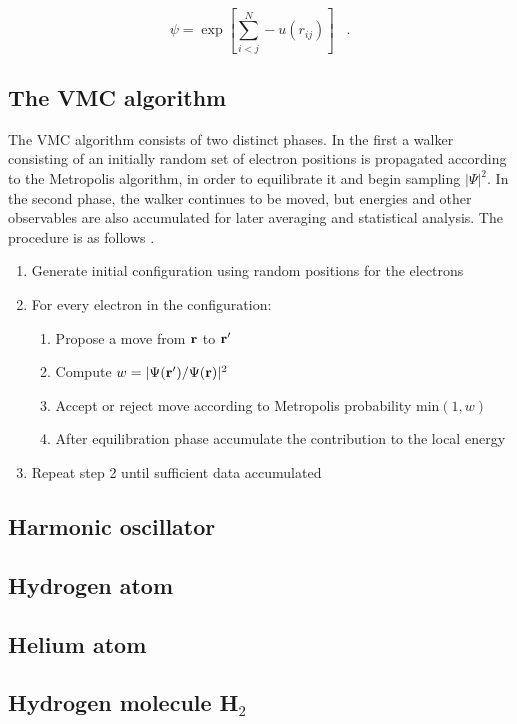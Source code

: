 \documentclass{article}
\begin{document}
\begin{equation}
\psi=\exp \left[ \sum_{i<j}^{N} -u(r_{ij}) \right] \;\;\;.
\end{equation}

\subsection{The VMC algorithm}
The VMC algorithm consists of two distinct phases. In the first a walker consisting of an initially random set of electron positions is propagated according to the Metropolis algorithm, in order to equilibrate it and begin sampling $\vert\Psi\vert^2$. In the second phase, the walker continues to be moved, but energies and other observables are also accumulated for later averaging and statistical analysis. The procedure is as follows \citep{thijssen2007computational}.

  \begin{enumerate}
    \item Generate initial configuration using random positions for the electrons
    \item For every electron in the configuration:
    \begin{enumerate}
     \item Propose a move from ${\bf r}$ to  ${\bf r}^\prime$
     \item Compute  $w=\vert\Psi({\bf r}^\prime)/\Psi({\bf r})\vert^2$
     \item Accept or reject move according to Metropolis probability $\mathrm{min}(1,w)$
     \item After equilibration phase accumulate the contribution to the local energy
    \end{enumerate}
    \item Repeat step 2 until sufficient data accumulated 
  \end{enumerate}

\subsection{Harmonic oscillator}
\subsection{Hydrogen atom}
\subsection{Helium atom}
\subsection{Hydrogen molecule H$_2$}
\end{document}
